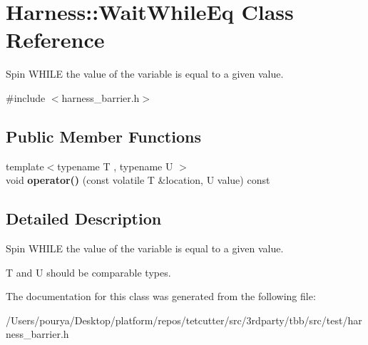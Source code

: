 \hypertarget{classHarness_1_1WaitWhileEq}{}\section{Harness\+:\+:Wait\+While\+Eq Class Reference}
\label{classHarness_1_1WaitWhileEq}


Spin W\+H\+I\+L\+E the value of the variable is equal to a given value.  




{\ttfamily \#include $<$harness\+\_\+barrier.\+h$>$}

\subsection*{Public Member Functions}
\begin{DoxyCompactItemize}
\item 
\hypertarget{classHarness_1_1WaitWhileEq_ab2cd59fafc59343e1210fcb75d1085bb}{}{\footnotesize template$<$typename T , typename U $>$ }\\void {\bfseries operator()} (const volatile T \&location, U value) const \label{classHarness_1_1WaitWhileEq_ab2cd59fafc59343e1210fcb75d1085bb}

\end{DoxyCompactItemize}


\subsection{Detailed Description}
Spin W\+H\+I\+L\+E the value of the variable is equal to a given value. 

T and U should be comparable types. 

The documentation for this class was generated from the following file\+:\begin{DoxyCompactItemize}
\item 
/\+Users/pourya/\+Desktop/platform/repos/tetcutter/src/3rdparty/tbb/src/test/harness\+\_\+barrier.\+h\end{DoxyCompactItemize}
